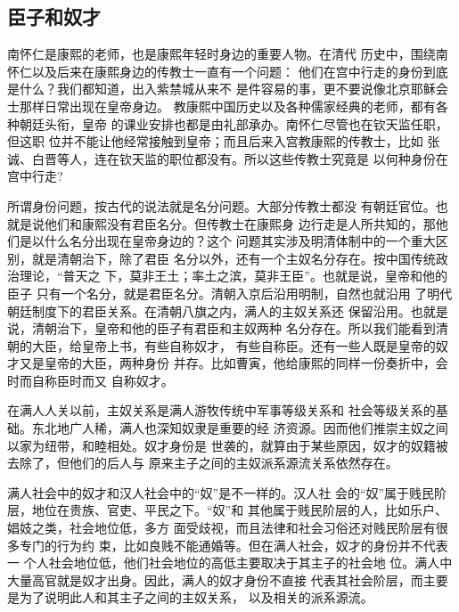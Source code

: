\subsection{臣子和奴才}
\par
南怀仁是康熙的老师，也是康熙年轻时身边的重要人物。在清代%
历史中，围绕南怀仁以及后来在康熙身边的传教士一直有一个问题：%
他们在宫中行走的身份到底是什么？我们都知道，出入紫禁城从来不%
是件容易的事，更不要说像北京耶稣会士那样日常出现在皇帝身边。%
教康熙中国历史以及各种儒家经典的老师，都有各种朝廷头衔，皇帝%
的课业安排也都是由礼部承办。南怀仁尽管也在钦天监任职，但这职%
位并不能让他经常接触到皇帝；而且后来入宫教康熙的传教士，比如%
张诚、白晋等人，连在钦天监的职位都没有。所以这些传教士究竟是%
以何种身份在宫中行走?%
\par
所谓身份问题，按古代的说法就是名分问题。大部分传教士都没%
有朝廷官位。也就是说他们和康熙没有君臣名分。但传教士在康熙身%
边行走是人所共知的，那他们是以什么名分出现在皇帝身边的？这个%
问题其实涉及明清体制中的一个重大区别，就是清朝治下，除了君臣%
名分以外，还有一个主奴名分存在。按中国传统政治理论，“普天之%
下，莫非王土；率土之滨，莫非王臣”。也就是说，皇帝和他的臣子%
只有一个名分，就是君臣名分。清朝入京后沿用明制，自然也就沿用%
了明代朝廷制度下的君臣关系。在清朝八旗之内，满人的主奴关系还%
保留沿用。也就是说，清朝治下，皇帝和他的臣子有君臣和主奴两种%
名分存在。所以我们能看到清朝的大臣，给皇帝上书，有些自称奴才，%
有些自称臣。还有一些人既是皇帝的奴才又是皇帝的大臣，两种身份%
并存。比如曹寅，他给康熙的同样一份奏折中，会时而自称臣时而又%
自称奴才。%
\par
在满人人关以前，主奴关系是满人游牧传统中军事等级关系和%
社会等级关系的基础。东北地广人稀，满人也深知奴隶是重要的经%
济资源。因而他们推崇主奴之间以家为纽带，和睦相处。奴才身份是%
世袭的，就算由于某些原因，奴才的奴籍被去除了，但他们的后人与%
原来主子之间的主奴派系源流关系依然存在。%
\par
满人社会中的奴才和汉人社会中的“奴”是不一样的。汉人社%
会的“奴”属于贱民阶层，地位在贵族、官吏、平民之下。“奴”和%
其他属于贱民阶层的人，比如乐户、娼妓之类，社会地位低，多方%
面受歧视，而且法律和社会习俗还对贱民阶层有很多专门的行为约%
束，比如良贱不能通婚等。但在满人社会，奴才的身份并不代表一%
个人社会地位低，他们社会地位的高低主要取决于其主子的社会地%
位。满人中大量高官就是奴才出身。因此，满人的奴才身份不直接%
代表其社会阶层，而主要是为了说明此人和其主子之间的主奴关系，%
以及相关的派系源流。%
\par

